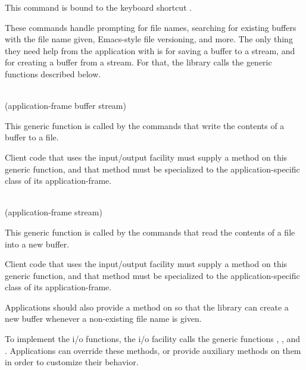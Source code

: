 This command is bound to the keyboard shortcut .

These commands handle prompting for file names, searching for existing
buffers with the file name given, Emacs-style file versioning, and
more.  The only thing they need help from the application with is for
saving a buffer to a stream, and for creating a buffer from a stream.
For that, the \sysname{} library calls the generic functions described
below.

\\
{(application-frame buffer stream)}

This generic function is called by the commands that write the
contents of a buffer to a file.

Client code that uses the \sysname{} input/output facility must supply
a method on this generic function, and that method must be specialized
to the application-specific class of its application-frame.

\\
{(application-frame stream)}

This generic function is called by the commands that read the
contents of a file into a new buffer.

Client code that uses the \sysname{} input/output facility must supply
a method on this generic function, and that method must be specialized
to the application-specific class of its application-frame.

Applications should also provide a method on
 so that the \sysname{}
library can create a new buffer whenever a non-existing file name is
given.

To implement the i/o functions, the \sysname{} i/o facility calls the
generic functions
,
, and
.  Applications can override these
methods, or provide auxiliary methods on them in order to customize
their behavior.
